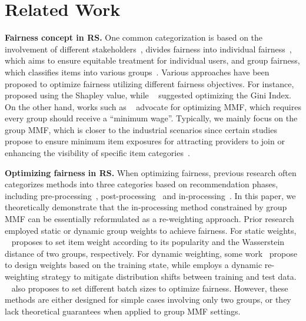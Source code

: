 \section{Related Work}
\textbf{Fairness concept in RS.} One common categorization is based on the involvement of different stakeholders~\citep{abdollahpouri2020multistakeholder, abdollahpouri2019multi}, divides fairness into individual fairness~\citep{marras2022equality, li2021towards}, which aims to ensure equitable treatment for individual users, and group fairness, which classifies items into various groups~\citep{xu2023p, xu2024fairsync, fairrec, cpfair, wu2021tfrom}. Various approaches have been proposed to optimize fairness utilizing different fairness objectives. For instance, ~\cite{fairrec} proposed using the Shapley value, while ~\cite{do2022optimizing} suggested optimizing the Gini Index. On the other hand, works such as ~\cite{xu2023p, nips21welf, xu2024fairsync} advocate for optimizing MMF, which requires every group should receive a ``minimum wage''. Typically, we mainly focus on the group MMF, which is closer to the industrial scenarios since certain studies propose to ensure minimum item exposures for attracting providers to join or enhancing the visibility of specific item categories~\citep{fairrec, xu2024fairsync, zhu2020measuring}.


\textbf{Optimizing fairness in RS.} When optimizing fairness, previous research often categorizes methods into three categories based on recommendation phases, including pre-processing~\citep{Calmon17, xiong2024fairwasp, xu-etal-2024-study}, post-processing~\citep{xu2023p, fairrec, wu2021tfrom, TaxRank} and in-processing~\citep{narasimhan2020pairwise, Tang23FairBias}. 
In this paper, we theoretically demonstrate that the in-processing method constrained by group MMF can be essentially reformulated as a re-weighting approach. Prior research employed static or dynamic group weights to achieve fairness. For static weights, ~\cite{jiang2024itemside, xiong2024fairwasp} proposes to set item weight according to its popularity and the Wasserstein distance of two groups, respectively.  For dynamic weighting, some work~\citep{chen2023fairly, chai2022fairness, wen2022distributionally} propose to design weights based on the training state, while \cite{hu2023adaptive} employs a dynamic re-weighting strategy to mitigate distribution shifts between training and test data. ~\cite{roh2020fairbatch} also proposes to set different batch sizes to optimize fairness. However, these methods are either designed for simple cases involving only two groups, or they lack theoretical guarantees when applied to group MMF settings.

